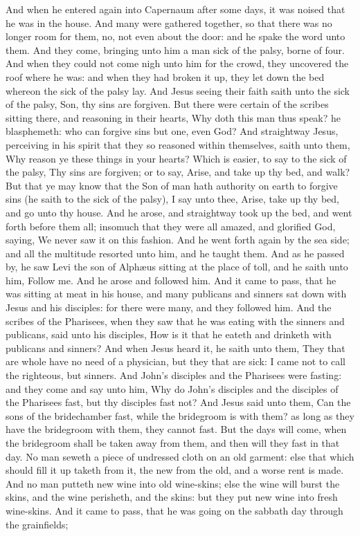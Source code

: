 And when he entered again into Capernaum after some days, it was noised that he was in the house. And many were gathered together, so that there was no longer room for them, no, not even about the door: and he spake the word unto them. And they come, bringing unto him a man sick of the palsy, borne of four. And when they could not come nigh unto him for the crowd, they uncovered the roof where he was: and when they had broken it up, they let down the bed whereon the sick of the palsy lay. And Jesus seeing their faith saith unto the sick of the palsy, Son, thy sins are forgiven. But there were certain of the scribes sitting there, and reasoning in their hearts, Why doth this man thus speak? he blasphemeth: who can forgive sins but one, even God? And straightway Jesus, perceiving in his spirit that they so reasoned within themselves, saith unto them, Why reason ye these things in your hearts? Which is easier, to say to the sick of the palsy, Thy sins are forgiven; or to say, Arise, and take up thy bed, and walk? But that ye may know that the Son of man hath authority on earth to forgive sins (he saith to the sick of the palsy), I say unto thee, Arise, take up thy bed, and go unto thy house. And he arose, and straightway took up the bed, and went forth before them all; insomuch that they were all amazed, and glorified God, saying, We never saw it on this fashion.  And he went forth again by the sea side; and all the multitude resorted unto him, and he taught them. And as he passed by, he saw Levi the son of Alphæus sitting at the place of toll, and he saith unto him, Follow me. And he arose and followed him.  And it came to pass, that he was sitting at meat in his house, and many publicans and sinners sat down with Jesus and his disciples: for there were many, and they followed him. And the scribes of the Pharisees, when they saw that he was eating with the sinners and publicans, said unto his disciples, How is it that he eateth and drinketh with publicans and sinners? And when Jesus heard it, he saith unto them, They that are whole have no need of a physician, but they that are sick: I came not to call the righteous, but sinners.  And John’s disciples and the Pharisees were fasting: and they come and say unto him, Why do John’s disciples and the disciples of the Pharisees fast, but thy disciples fast not? And Jesus said unto them, Can the sons of the bridechamber fast, while the bridegroom is with them? as long as they have the bridegroom with them, they cannot fast. But the days will come, when the bridegroom shall be taken away from them, and then will they fast in that day. No man seweth a piece of undressed cloth on an old garment: else that which should fill it up taketh from it, the new from the old, and a worse rent is made. And no man putteth new wine into old wine-skins; else the wine will burst the skins, and the wine perisheth, and the skins: but they put new wine into fresh wine-skins.  And it came to pass, that he was going on the sabbath day through the grainfields; 